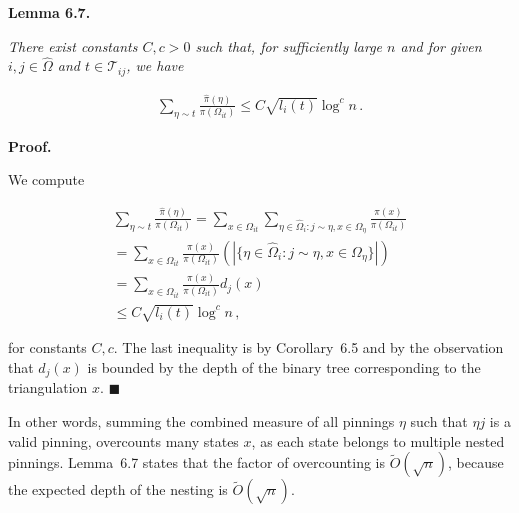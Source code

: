 \documentclass[10pt,a4paper]{article}
\begin{document}
\par\medskip\noindent\textbf{\textbf{Lemma 6.7}\textbf{.}}\par



\emph{There exist constants $C,c>0$ such that, for sufficiently large $n$ and for given $i,j\in\hat{\Omega}$ and $t\in\mathcal{T}_{ij}$, we have}\par


\[\begin{gathered}
\sum_{\eta\sim t}\frac{\hat{\pi}(\eta)}{\pi(\Omega_{it})}\leq C\sqrt{l_{i}(t)}\log^{c}n\,.
\end{gathered}\]






\par\medskip\noindent\textbf{Proof.}\par



We compute\par


\[\begin{gathered}
\displaystyle\sum_{\eta\sim t}\frac{\hat{\pi}(\eta)}{\pi(\Omega_{it})} \displaystyle=\sum_{x\in\Omega_{it}}\sum_{\eta\in\hat{\Omega}_{i}:j\sim\eta,x\in\Omega_{\eta}}\frac{\pi(x)}{\pi(\Omega_{it})} \\
\displaystyle=\sum_{x\in\Omega_{it}}\frac{\pi(x)}{\pi(\Omega_{it})}\left(|\{\eta\in\hat{\Omega}_{i}:j\sim\eta,x\in\Omega_{\eta}\}|\right) \\
\displaystyle=\sum_{x\in\Omega_{it}}\frac{\pi(x)}{\pi(\Omega_{it})}d_{j}(x) \\
\displaystyle\leq C\sqrt{l_{i}(t)}\log^{c}n\,,
\end{gathered}\]


for constants $C,c$.
The last inequality is by Corollary 6.5 and by the observation that $d_{j}(x)$ is bounded by the depth of the binary tree corresponding to the triangulation $x$.
\ensuremath{\blacksquare}\par





In other words, summing the combined measure of all pinnings $\eta$ such that $\eta j$ is a valid pinning, overcounts many states $x$, as each state belongs to multiple nested pinnings. Lemma 6.7 states that the factor of overcounting is $\widetilde{O}(\sqrt{n})$, because the expected depth of the nesting is $\widetilde{O}(\sqrt{n})$.\par
\end{document}
